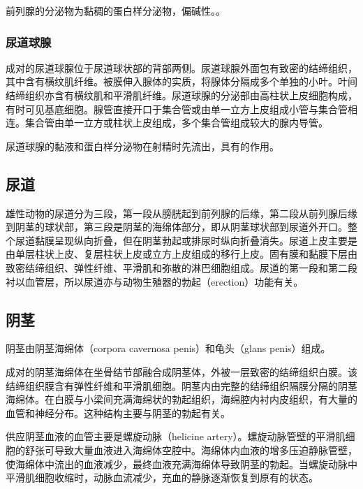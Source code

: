 前列腺的分泌物为黏稠的蛋白样分泌物，偏碱性。。

\subsubsection{尿道球腺}

成对的尿道球腺位于尿道球状部的背部两侧。尿道球腺外面包有致密的结缔组织，其中含有横纹肌纤维。被膜伸入腺体的实质，将腺体分隔成多个单独的小叶。叶间结缔组织亦含有横纹肌和平滑肌纤维。尿道球腺的分泌部由高柱状上皮细胞构成，有时可见基底细胞。腺管直接开口于集合管或由单一立方上皮组成小管与集合管相连。集合管由单一立方或柱状上皮组成，多个集合管组成较大的腺内导管。

尿道球腺的黏液和蛋白样分泌物在射精时先流出，具有的作用。

\subsection{尿道}

雄性动物的尿道分为三段，第一段从膀胱起到前列腺的后缘，第二段从前列腺后缘到阴茎的球状部，第三段是阴茎的海绵体部分，即从阴茎球状部到尿道外开口。整个尿道黏膜呈现纵向折叠，但在阴茎勃起或排尿时纵向折叠消失。尿道上皮主要是由单层柱状上皮、复层柱状上皮或立方上皮组成的移行上皮。固有膜和黏膜下层由致密结缔组织、弹性纤维、平滑肌和弥散的淋巴细胞组成。尿道的第一段和第二段衬以血管层，所以尿道亦与动物生殖器的勃起（erection）功能有关。

\subsection{阴茎}

阴茎由阴茎海绵体（corpora cavernosa penis）和龟头（glans penis）组成。

成对的阴茎海绵体在坐骨结节部融合成阴茎体，外被一层致密的结缔组织白膜。该结缔组织膜含有弹性纤维和平滑肌细胞。阴茎内由完整的结缔组织隔膜分隔的阴茎海绵体。在白膜与小梁间充满海绵状的勃起组织，海绵腔内衬内皮组织，有大量的血管和神经分布。这种结构主要与阴茎的勃起有关。

供应阴茎血液的血管主要是螺旋动脉（helicine artery）。螺旋动脉管壁的平滑肌细胞的舒张可导致大量血液进入海绵体空腔中。海绵体内血液的增多压迫静脉管壁，使海绵体中流出的血液减少，最终血液充满海绵体导致阴茎的勃起。当螺旋动脉中平滑肌细胞收缩时，动脉血流减少，充血的静脉逐渐恢复到原有的状态。